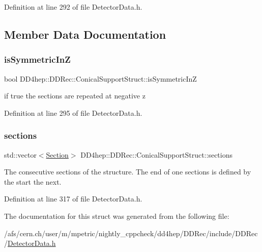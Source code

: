 Definition at line 292 of file Detector\+Data.\+h.



\subsection{Member Data Documentation}
\hypertarget{struct_d_d4hep_1_1_d_d_rec_1_1_conical_support_struct_a9cb0f5d34f19a983ca5336b6c82f52d2}{}\label{struct_d_d4hep_1_1_d_d_rec_1_1_conical_support_struct_a9cb0f5d34f19a983ca5336b6c82f52d2} 
\subsubsection{\texorpdfstring{is\+Symmetric\+InZ}{isSymmetricInZ}}
{\footnotesize\ttfamily bool D\+D4hep\+::\+D\+D\+Rec\+::\+Conical\+Support\+Struct\+::is\+Symmetric\+InZ}



if true the sections are repeated at negative z 



Definition at line 295 of file Detector\+Data.\+h.

\hypertarget{struct_d_d4hep_1_1_d_d_rec_1_1_conical_support_struct_ae2b42dab35860f91bf4b048850f1e63b}{}\label{struct_d_d4hep_1_1_d_d_rec_1_1_conical_support_struct_ae2b42dab35860f91bf4b048850f1e63b} 
\subsubsection{\texorpdfstring{sections}{sections}}
{\footnotesize\ttfamily std\+::vector$<$\hyperlink{struct_d_d4hep_1_1_d_d_rec_1_1_conical_support_struct_1_1_section}{Section}$>$ D\+D4hep\+::\+D\+D\+Rec\+::\+Conical\+Support\+Struct\+::sections}

The consecutive sections of the structure. The end of one sections is defined by the start the next. 

Definition at line 317 of file Detector\+Data.\+h.



The documentation for this struct was generated from the following file\+:\begin{DoxyCompactItemize}
\item 
/afs/cern.\+ch/user/m/mpetric/nightly\+\_\+cppcheck/dd4hep/\+D\+D\+Rec/include/\+D\+D\+Rec/\hyperlink{_detector_data_8h}{Detector\+Data.\+h}\end{DoxyCompactItemize}
